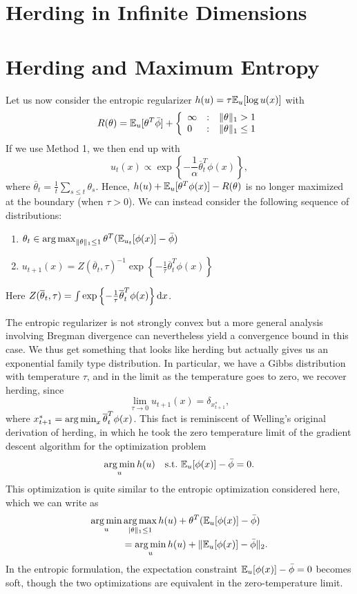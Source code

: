 \documentclass{article}
\begin{document}
\section{Herding in Infinite Dimensions}
\label{sec:infinite-case}

\section{Herding and Maximum Entropy}
\label{sec:max-ent}

Let us now consider the entropic regularizer $h(u) = \tau\mathbb{E}_{u}[\log u(x)]$ with 
\[ R(\theta) = \mathbb{E}_{u}[\theta^T\bar{\phi}] + \left\{ \begin{array}{llc} \infty & : & \|\theta\|_1 > 1 \\ 0 & : & \|\theta\|_1 \leq 1 \end{array} \right.\]
If we use Method 1, we then end up with 
\[ u_{t}(x) \propto \exp\left\{-\frac{1}{\alpha}\overline{\theta}_{t}^T\phi(x)\right\}, \]
where $\overline{\theta}_{t} = \frac{1}{t} \sum_{s \le t} \theta_{s}$. Hence, $h(u) + \mathbb{E}_{u}[\theta^T\phi(x)] - R(\theta)$ is no longer maximized at the boundary (when $\tau > 0$). We can instead consider the following sequence of distributions:
\begin{enumerate}
\item $\theta_t \in \argmax_{\|\theta\|_1 \leq 1} \theta^T (\bE_{u_t}[\phi(x)]-\bar{\phi})$
\item $u_{t+1}(x) = Z(\overline{\theta}_{t}, \tau)^{-1} \exp\left\{-\frac{1}{\tau}\overline{\theta}_{t}^T\phi(x)\right\}$
\end{enumerate}
Here $Z(\overline{\theta}_{t}, \tau) = \int\exp\left\{-\frac{1}{\tau}\overline{\theta}_{t}^T\phi(x)\right\} \mathrm{d} x$. 

The entropic regularizer is not strongly convex but a more general analysis involving 
Bregman divergence can nevertheless yield a convergence bound in this case. We thus 
get something that looks like herding but actually gives us an exponential family 
type distribution. In particular, we have a Gibbs distribution with temperature $\tau$, and 
in the limit as the temperature goes to zero, we recover herding, since 
\[ \lim_{\tau \to 0} u_{t+1}(x) = \delta_{x^{*}_{t+1}}, \]
where $x^{*}_{t+1} = \argmin_{x} \overline{\theta}_{t}^T\phi(x)$. 
This fact is reminiscent of Welling's original derivation of herding, in which 
he took the zero temperature limit of the gradient descent algorithm for the optimization problem 
\[ \argmin_{u} h(u) \quad \text{s.t.}~\bE_{u}[\phi(x)] - \bar\phi = 0. \]
This optimization is quite similar to the entropic optimization considered here, which 
we can write as 
\begin{align*}
\argmin_{u}& \argmax_{|\theta\|_1 \leq 1} h(u) + \theta^{T}(\bE_{u}[\phi(x)] - \bar \phi)  \\
&= \argmin_{u} h(u) + \|\bE_{u}[\phi(x)] - \bar\phi\|_{2}. 
\end{align*}
In the entropic formulation, the expectation constraint $\mathbb{E}_{u}[\phi(x)] - \bar\phi = 0$ becomes
soft, though the two optimizations are equivalent in the zero-temperature limit. 
\end{document}
